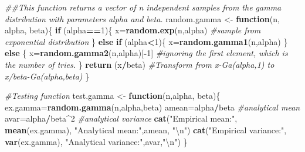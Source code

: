 \documentclass[]{article}
\newenvironment{Shaded}{\begin{snugshade}}{\end{snugshade}}
\newcommand{\CharTok}[1]{\textcolor[rgb]{0.31,0.60,0.02}{#1}}
\newcommand{\CommentTok}[1]{\textcolor[rgb]{0.56,0.35,0.01}{\textit{#1}}}
\newcommand{\ControlFlowTok}[1]{\textcolor[rgb]{0.13,0.29,0.53}{\textbf{#1}}}
\newcommand{\DecValTok}[1]{\textcolor[rgb]{0.00,0.00,0.81}{#1}}
\newcommand{\KeywordTok}[1]{\textcolor[rgb]{0.13,0.29,0.53}{\textbf{#1}}}
\newcommand{\NormalTok}[1]{#1}
\newcommand{\OperatorTok}[1]{\textcolor[rgb]{0.81,0.36,0.00}{\textbf{#1}}}
\newcommand{\StringTok}[1]{\textcolor[rgb]{0.31,0.60,0.02}{#1}}
\begin{document}
\begin{Shaded}
\begin{Highlighting}[]
\CommentTok{##This function returns a vector of n independent samples from the gamma distribution with parameters alpha and beta. }
\NormalTok{random.gamma <-}\StringTok{ }\ControlFlowTok{function}\NormalTok{(n, alpha, beta)\{}
  \ControlFlowTok{if}\NormalTok{ (alpha}\OperatorTok{==}\DecValTok{1}\NormalTok{)\{}
\NormalTok{    x=}\KeywordTok{random.exp}\NormalTok{(n,alpha) }\CommentTok{#sample from exponential distribution}
\NormalTok{  \}}
  \ControlFlowTok{else} \ControlFlowTok{if}\NormalTok{ (alpha}\OperatorTok{<}\DecValTok{1}\NormalTok{)\{}
\NormalTok{    x=}\KeywordTok{random.gamma1}\NormalTok{(n,alpha) }
\NormalTok{  \}}
  \ControlFlowTok{else}\NormalTok{ \{}
\NormalTok{    x=}\KeywordTok{random.gamma2}\NormalTok{(n,alpha)[}\OperatorTok{-}\DecValTok{1}\NormalTok{] }\CommentTok{#ignoring the first element, which is the number of tries. }
\NormalTok{  \}}
  \KeywordTok{return}\NormalTok{ (x}\OperatorTok{/}\NormalTok{beta) }\CommentTok{#Transform from x-Ga(alpha,1) to x/beta-Ga(alpha,beta)}
\NormalTok{\}}

\CommentTok{#Testing function }
\NormalTok{test.gamma <-}\StringTok{ }\ControlFlowTok{function}\NormalTok{(n,alpha, beta)\{}
\NormalTok{  ex.gamma=}\KeywordTok{random.gamma}\NormalTok{(n,alpha,beta)}
\NormalTok{  amean=alpha}\OperatorTok{/}\NormalTok{beta }\CommentTok{#analytical mean}
\NormalTok{  avar=alpha}\OperatorTok{/}\NormalTok{beta}\OperatorTok{^}\DecValTok{2} \CommentTok{#analytical variance}
  \KeywordTok{cat}\NormalTok{(}\StringTok{"Empirical mean:"}\NormalTok{, }\KeywordTok{mean}\NormalTok{(ex.gamma), }\StringTok{"Analytical mean:"}\NormalTok{,amean, }\StringTok{"}\CharTok{\textbackslash{}n}\StringTok{"}\NormalTok{)}
  \KeywordTok{cat}\NormalTok{(}\StringTok{"Empirical variance:"}\NormalTok{, }\KeywordTok{var}\NormalTok{(ex.gamma), }\StringTok{"Analytical variance:"}\NormalTok{,avar,}\StringTok{"}\CharTok{\textbackslash{}n}\StringTok{"}\NormalTok{)}
\NormalTok{\}}


\end{Highlighting}
\end{Shaded}
\end{document}
